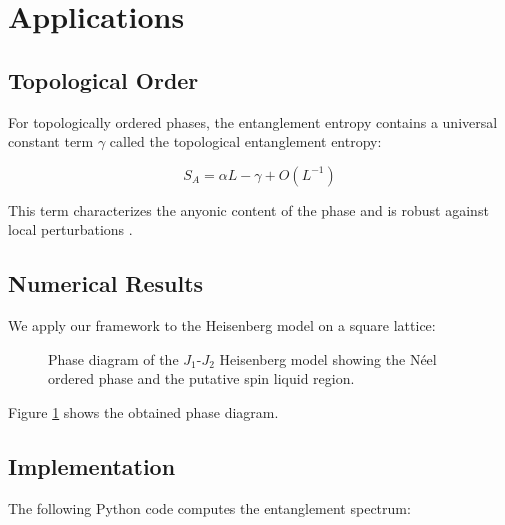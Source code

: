 \documentclass[paper]{academic-report}
\begin{document}
\section{Applications}

\subsection{Topological Order}

For topologically ordered phases, the entanglement entropy contains a universal
constant term $\gamma$ called the topological entanglement entropy:

\begin{equation}
  S_A = \alpha L - \gamma + O(L^{-1})
\end{equation}

This term characterizes the anyonic content of the phase and is robust against
local perturbations \cite{kitaev2006}.

\subsection{Numerical Results}

We apply our framework to the Heisenberg model on a square lattice:

\begin{figure}[htbp]
  \centering
  \caption{Phase diagram of the $J_1$-$J_2$ Heisenberg model showing the
           N\'eel ordered phase and the putative spin liquid region.}
  \label{fig:phasediagram}
\end{figure}

Figure \ref{fig:phasediagram} shows the obtained phase diagram.

\subsection{Implementation}

The following Python code computes the entanglement spectrum:
\end{document}
